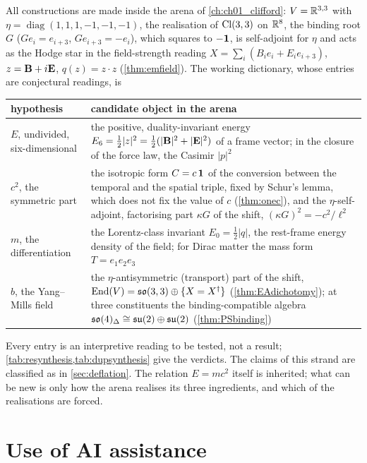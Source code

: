 {\sloppy All constructions are made inside the arena of \cref{ch:ch01_clifford}: $V=\mathbb{R}^{3,3}$ with $\eta=\operatorname{diag}(1,1,1,-1,-1,-1)$, the realisation
of $\mathrm{Cl}(3,3)$ on $\mathbb{R}^8$, the binding root $G$ ($Ge_i=e_{i+3}$, $Ge_{i+3}=-e_i$), which squares to $-\mathbf 1$, is self-adjoint for $\eta$ and
acts as the Hodge star in the field-strength reading $X=\sum_i(B_ie_i+E_ie_{i+3})$, $z=\mathbf B+i\mathbf E$, $q(z)=z\cdot z$
(\cref{thm:emfield}). The working dictionary, whose entries are conjectural readings, is\par}
\begin{center}
\small
\begin{tabular}{@{}>{\raggedright\arraybackslash}p{3.4cm}>{\raggedright\arraybackslash}p{11.0cm}@{}}
\toprule
hypothesis & candidate object in the arena\\
\midrule
$E$, undivided, six-dimensional & the positive, duality-invariant energy $E_6=\tfrac12|z|^2=\tfrac12(|\mathbf B|^2+|\mathbf E|^2)$ of a frame vector; in
the closure of the force law, the Casimir $|p|^2$\\
$c^2$, the symmetric part & the isotropic form $C=c\,\mathbf 1$ of the conversion between the temporal and the spatial triple, fixed by Schur's
lemma, which does not fix the value of $c$ (\cref{thm:onec}), and the $\eta$-self-adjoint, factorising part $\kappa G$ of the shift, $(\kappa G)^2=-c^2/\ell^2$\\
$m$, the differentiation & the Lorentz-class invariant $E_0=\tfrac12|q|$, the rest-frame energy density of the field; for Dirac matter the mass
form $T=e_1e_2e_3$\\
$b$, the Yang--Mills field & the $\eta$-antisymmetric (transport) part of the shift, $\operatorname{End}(V)=\mathfrak{so}(3,3)\oplus\{X=X^\dagger\}$
(\cref{thm:EAdichotomy}); at three constituents the binding-compatible algebra $\mathfrak{so}(4)_\Delta\cong\mathfrak{su}(2)\oplus\mathfrak{su}(2)$ (\cref{thm:PSbinding})\\
\bottomrule
\end{tabular}
\end{center}
Every entry is an interpretive reading to be tested, not a result; \cref{tab:resynthesis,tab:dupsynthesis} give the verdicts. The claims of
this strand are classified as in \cref{sec:deflation}. The relation $E=mc^2$ itself is inherited; what can be new is only how the arena
realises its three ingredients, and which of the realisations are forced.

\section{Use of AI assistance}
\label{sec:fm:disclosure}

